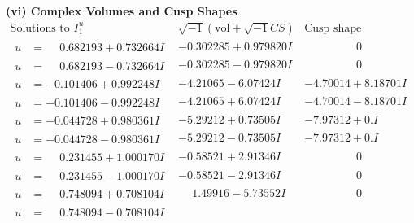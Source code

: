 \documentclass[1p]{elsarticle_modified}
\theoremstyle{definition}
\newcommand{\I}{\sqrt{-1}}
\begin{document}
\newpage\flushleft \textbf{(vi) Complex Volumes and Cusp Shapes}
$$\begin{array}{c|c|c}  
\text{Solutions to }I^u_{1}& \I (\text{vol} + \sqrt{-1}CS) & \text{Cusp shape}\\
 \hline 
\begin{aligned}
u &= \phantom{-}0.682193 + 0.732664 I\end{aligned}
 & -0.302285 + 0.979820 I & \phantom{-0.000000 } 0 \\ \hline\begin{aligned}
u &= \phantom{-}0.682193 - 0.732664 I\end{aligned}
 & -0.302285 - 0.979820 I & \phantom{-0.000000 } 0 \\ \hline\begin{aligned}
u &= -0.101406 + 0.992248 I\end{aligned}
 & -4.21065 - 6.07424 I & -4.70014 + 8.18701 I \\ \hline\begin{aligned}
u &= -0.101406 - 0.992248 I\end{aligned}
 & -4.21065 + 6.07424 I & -4.70014 - 8.18701 I \\ \hline\begin{aligned}
u &= -0.044728 + 0.980361 I\end{aligned}
 & -5.29212 + 0.73505 I & -7.97312 + 0. I\phantom{ +0.000000I} \\ \hline\begin{aligned}
u &= -0.044728 - 0.980361 I\end{aligned}
 & -5.29212 - 0.73505 I & -7.97312 + 0. I\phantom{ +0.000000I} \\ \hline\begin{aligned}
u &= \phantom{-}0.231455 + 1.000170 I\end{aligned}
 & -0.58521 + 2.91346 I & \phantom{-0.000000 } 0 \\ \hline\begin{aligned}
u &= \phantom{-}0.231455 - 1.000170 I\end{aligned}
 & -0.58521 - 2.91346 I & \phantom{-0.000000 } 0 \\ \hline\begin{aligned}
u &= \phantom{-}0.748094 + 0.708104 I\end{aligned}
 & \phantom{-}1.49916 - 5.73552 I & \phantom{-0.000000 } 0 \\ \hline\begin{aligned}
u &= \phantom{-}0.748094 - 0.708104 I\end{aligned}

\end{array}$$
\end{document}
